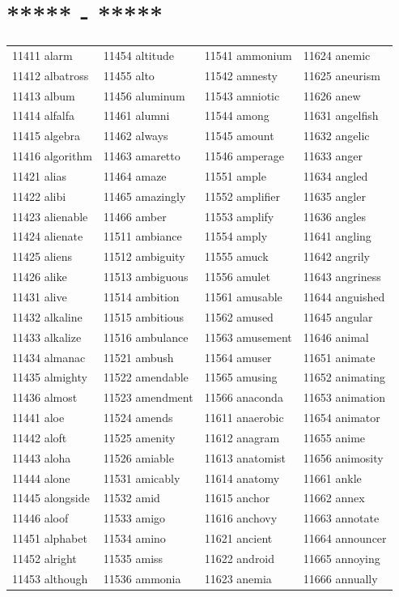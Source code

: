 \documentclass[10pt, oneside]{book}
\begin{document}
\begin{table}
	\centering
	\section*{***** - *****}
	\begin{tabular}{l l l l}
11411 alarm &11454 altitude &11541 ammonium &11624 anemic\\
11412 albatross &11455 alto &11542 amnesty &11625 aneurism\\
11413 album &11456 aluminum &11543 amniotic &11626 anew\\
11414 alfalfa &11461 alumni &11544 among &11631 angelfish\\
11415 algebra &11462 always &11545 amount &11632 angelic\\
11416 algorithm &11463 amaretto &11546 amperage &11633 anger\\
11421 alias &11464 amaze &11551 ample &11634 angled\\
11422 alibi &11465 amazingly &11552 amplifier &11635 angler\\
11423 alienable &11466 amber &11553 amplify &11636 angles\\
11424 alienate &11511 ambiance &11554 amply &11641 angling\\
11425 aliens &11512 ambiguity &11555 amuck &11642 angrily\\
11426 alike &11513 ambiguous &11556 amulet &11643 angriness\\
11431 alive &11514 ambition &11561 amusable &11644 anguished\\
11432 alkaline &11515 ambitious &11562 amused &11645 angular\\
11433 alkalize &11516 ambulance &11563 amusement &11646 animal\\
11434 almanac &11521 ambush &11564 amuser &11651 animate\\
11435 almighty &11522 amendable &11565 amusing &11652 animating\\
11436 almost &11523 amendment &11566 anaconda &11653 animation\\
11441 aloe &11524 amends &11611 anaerobic &11654 animator\\
11442 aloft &11525 amenity &11612 anagram &11655 anime\\
11443 aloha &11526 amiable &11613 anatomist &11656 animosity\\
11444 alone &11531 amicably &11614 anatomy &11661 ankle\\
11445 alongside &11532 amid &11615 anchor &11662 annex\\
11446 aloof &11533 amigo &11616 anchovy &11663 annotate\\
11451 alphabet &11534 amino &11621 ancient &11664 announcer\\
11452 alright &11535 amiss &11622 android &11665 annoying\\
11453 although &11536 ammonia &11623 anemia &11666 annually\\
	\end{tabular}
 \end{table}
\end{document}
